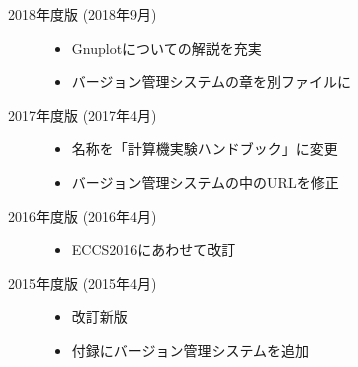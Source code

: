 \begin{description}
    \item[2018年度版 (2018年9月)] \mbox{}

          \begin{itemize}
              \item Gnuplotについての解説を充実
              \item バージョン管理システムの章を別ファイルに
          \end{itemize}

    \item[2017年度版 (2017年4月)] \mbox{}

          \begin{itemize}
              \item 名称を「計算機実験ハンドブック」に変更
              \item バージョン管理システムの中のURLを修正
          \end{itemize}

    \item[2016年度版 (2016年4月)] \mbox{}

          \begin{itemize}
              \item ECCS2016にあわせて改訂
          \end{itemize}

    \item[2015年度版 (2015年4月)] \mbox{}

          \begin{itemize}
              \item 改訂新版
              \item 付録にバージョン管理システムを追加
          \end{itemize}

\end{description}
